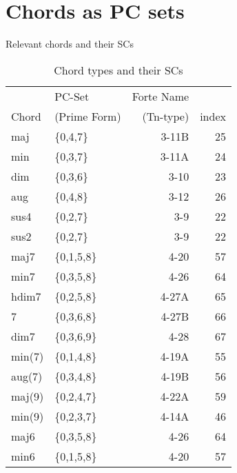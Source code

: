 \documentclass{article}
\begin{document}


\section{Chords as PC sets}
\label{sec-13}

Relevant chords and their SCs
\begin{table}[htb]
\caption{Chord types and their SCs} 
\begin{center}
\begin{tabular}{llrr}
\hline
             &  PC-Set                &  Forte Name  &         \\
 Chord       &  (Prime Form)          &   (Tn-type)  &  index  \\
\hline
 maj         &  \{0,4,7\}             &       3-11B  &     25  \\
 min         &  \{0,3,7\}             &       3-11A  &     24  \\
 dim         &  \{0,3,6\}             &        3-10  &     23  \\
 aug         &  \{0,4,8\}             &        3-12  &     26  \\
 sus4        &  \{0,2,7\}             &         3-9  &     22  \\
 sus2        &  \{0,2,7\}             &         3-9  &     22  \\
\hline
 maj7        &  \{0,1,5,8\}           &        4-20  &     57  \\
 min7        &  \{0,3,5,8\}           &        4-26  &     64  \\
 hdim7       &  \{0,2,5,8\}           &       4-27A  &     65  \\
 7           &  \{0,3,6,8\}           &       4-27B  &     66  \\
 dim7        &  \{0,3,6,9\}           &        4-28  &     67  \\
 min(7)      &  \{0,1,4,8\}           &       4-19A  &     55  \\
 aug(7)      &  \{0,3,4,8\}           &       4-19B  &     56  \\
 maj(9)      &  \{0,2,4,7\}           &       4-22A  &     59  \\
 min(9)      &  \{0,2,3,7\}           &       4-14A  &     46  \\
 maj6        &  \{0,3,5,8\}           &        4-26  &     64  \\
 min6        &  \{0,1,5,8\}           &        4-20  &     57  \\

\end{tabular}
\end{center}
\end{table}
\end{document}
